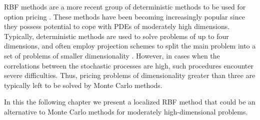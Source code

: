 \documentclass{UUThesisTemplate}
\begin{document}
\par RBF methods are a more recent group of deterministic methods to be used for option pricing \cite{hon1999radial}. These methods have been becoming increasingly popular since they possess potential to cope with PDEs of moderately high dimensions. Typically, deterministic methods are used to solve problems of up to four dimensions, and often employ projection schemes to split the main problem into a set of problems of smaller dimensionality \cite{foulon2010adi}. However, in cases when the correlations between the stochastic processes are high, such procedures encounter severe difficulties. Thus, pricing problems of dimensionality greater than three are typically left to be solved by Monte Carlo methods. 
\par In this the following chapter we present a localized RBF method that could be an alternative to Monte Carlo methods for moderately high-dimensional problems.
%
%
\end{document}
